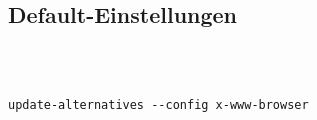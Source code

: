 \subsection{Default-Einstellungen}
\begin{verbatim}



update-alternatives --config x-www-browser
\end{verbatim}
